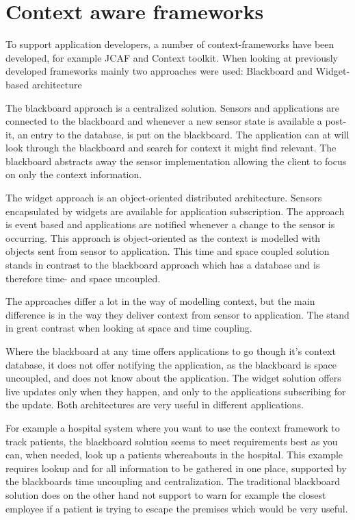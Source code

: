 \documentclass[../report.tex]{subfiles}
\begin{document}
\section{Context aware frameworks}
To support application developers, a number of context-frameworks have been developed, for example JCAF and Context toolkit. When looking at previously developed frameworks mainly two approaches were used: Blackboard and Widget-based architecture \cite{Context-aware computing (2010)}

The blackboard approach is a centralized solution. Sensors and applications are connected to the blackboard and whenever a new sensor state is available a post-it, an entry to the database, is put on the blackboard. The application can at will look through the blackboard and search for context it might find relevant. The blackboard abstracts away the sensor implementation allowing the client to focus on only the context information. 

The widget approach is an object-oriented distributed architecture. Sensors encapsulated by widgets are available for application subscription. The approach is event based and applications are notified whenever a change to the sensor is occurring. This approach is object-oriented as the context is modelled with objects sent from sensor to application. This time and space coupled solution stands in contrast to the blackboard approach which has a database and is therefore time- and space uncoupled.

The approaches differ a lot in the way of modelling context, but the main difference is in the way they deliver context from sensor to application. The stand in great contrast when looking at space and time coupling. 

Where the blackboard at any time offers applications to go though it's context database, it does not offer notifying the application, as the blackboard is space uncoupled, and does not know about the application. The widget solution offers live updates only when they happen, and only to the applications subscribing for the update. Both architectures are very useful in different applications.

For example a hospital system where you want to use the context framework to track patients, the blackboard solution seems to meet requirements best as you can, when needed, look up a patients whereabouts in the hospital.
This example requires lookup and for all information to be gathered in one place, supported by the blackboards time uncoupling and centralization. The traditional blackboard solution does on the other hand not support to warn for example the closest employee if a patient is trying to escape the premises which would be very useful.
\end{document}
